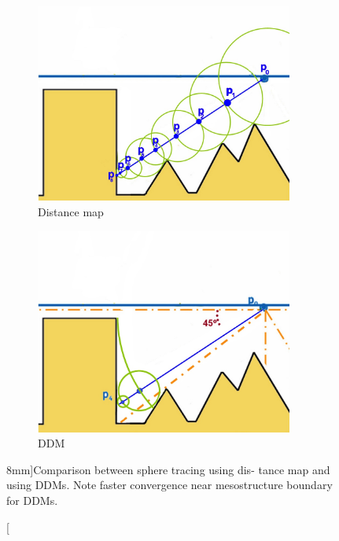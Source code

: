 \begin{figure}\label{f:directional-distance-map-sphere-tracing}
	\begin{subfigure}[b]{0.5\textwidth}
	\begin{center}
		\includegraphics[width=0.93\textwidth]{graphics/df/ddm-comparision-1}
		\end{center}	
		\caption{Distance map}
	\end{subfigure}
	\begin{subfigure}[b]{0.5\textwidth}
	\begin{center}
		\includegraphics[width=0.93\textwidth]{graphics/df/ddm-comparision-2}	
		\end{center}
		\caption{DDM}
	\end{subfigure}
\caption[][8mm]{Comparison between sphere tracing using dis- tance map and using DDMs. Note faster convergence near mesostructure boundary for DDMs.}
\end{figure}

